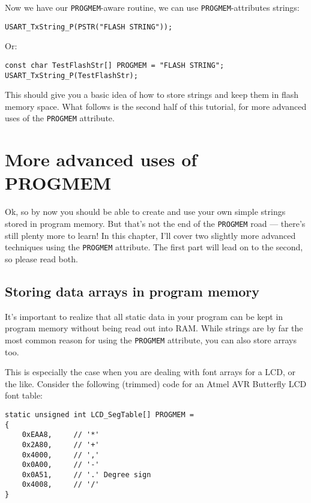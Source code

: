 \documentclass[a4paper,oneside,notitlepage]{book}
\begin{document}
Now we have our \lstinline{PROGMEM}-aware routine, we can use \lstinline{PROGMEM}-attributes strings:

\begin{center}
\begin{lstlisting}
USART_TxString_P(PSTR("FLASH STRING"));
\end{lstlisting}
\end{center}

Or:

\begin{center}
\begin{lstlisting}
const char TestFlashStr[] PROGMEM = "FLASH STRING";
USART_TxString_P(TestFlashStr);
\end{lstlisting}
\end{center}

This should give you a basic idea of how to store strings and keep them in flash memory space. What follows is the second half of this tutorial, for more advanced uses of the \lstinline{PROGMEM} attribute.


\label{chp:advprogmem}
\chapter{More advanced uses of PROGMEM}

Ok, so by now you should be able to create and use your own simple strings stored in program memory. But that's not the end of the \lstinline{PROGMEM} road --- there's still plenty more to learn! In this chapter, I'll cover two slightly more advanced techniques using the \lstinline{PROGMEM} attribute. The first part will lead on to the second, so please read both.

\section{Storing data arrays in program memory}

It's important to realize that all static data in your program can be kept in program memory without being read out into RAM. While strings are by far the most common reason for using the \lstinline{PROGMEM} attribute, you can also store arrays too.

This is especially the case when you are dealing with font arrays for a LCD, or the like. Consider the following (trimmed) code for an Atmel AVR Butterfly LCD font table:

\begin{center}
\begin{lstlisting}
static unsigned int LCD_SegTable[] PROGMEM =
{
    0xEAA8,     // '*'
    0x2A80,     // '+'
    0x4000,     // ','
    0x0A00,     // '-'
    0x0A51,     // '.' Degree sign
    0x4008,     // '/'
}
\end{lstlisting}
\end{center}
\end{document}
